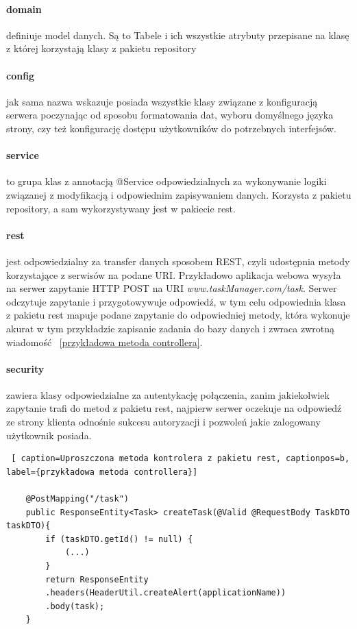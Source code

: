 \paragraph{domain}

definiuje model danych. Są to Tabele i ich wszystkie atrybuty przepisane na klasę z której korzystają klasy z pakietu repository
\paragraph{config}
jak sama nazwa wskazuje posiada wszystkie klasy związane z konfiguracją serwera poczynając od sposobu formatowania dat, wyboru domyślnego języka strony, czy też konfigurację dostępu użytkowników do potrzebnych interfejsów.
\paragraph{service}  to grupa klas z annotacją @Service odpowiedzialnych za wykonywanie logiki związanej z modyfikacją i odpowiednim zapisywaniem danych. Korzysta z pakietu repository, a sam wykorzystywany jest w pakiecie rest.
\paragraph{rest}  jest odpowiedzialny za transfer danych sposobem REST, czyli udostępnia  metody korzystające z serwisów na podane URI. Przykładowo aplikacja webowa wysyła na serwer zapytanie HTTP POST na URI
\textit{www.taskManager.com/task}. Serwer odczytuje zapytanie i przygotowywuje odpowiedź, w tym celu odpowiednia klasa z pakietu rest mapuje podane zapytanie do odpowiedniej metody, która wykonuje akurat w tym przykładzie zapisanie zadania do bazy danych i zwraca zwrotną wiadomość ~\ref{przykładowa metoda controllera}.

\paragraph{security} zawiera klasy odpowiedzialne za autentykację połączenia, zanim jakiekolwiek zapytanie trafi do metod z pakietu rest, najpierw serwer oczekuje na odpowiedź ze strony klienta odnośnie sukcesu autoryzacji i pozwoleń jakie zalogowany użytkownik posiada.

\begin{lstlisting} [ caption=Uproszczona metoda kontrolera z pakietu rest, captionpos=b, label={przykładowa metoda controllera}]
	
	@PostMapping("/task")
	public ResponseEntity<Task> createTask(@Valid @RequestBody TaskDTO taskDTO){
		if (taskDTO.getId() != null) {
			(...)
		}
		return ResponseEntity
		.headers(HeaderUtil.createAlert(applicationName))
		.body(task);
	}
	
\end{lstlisting}

